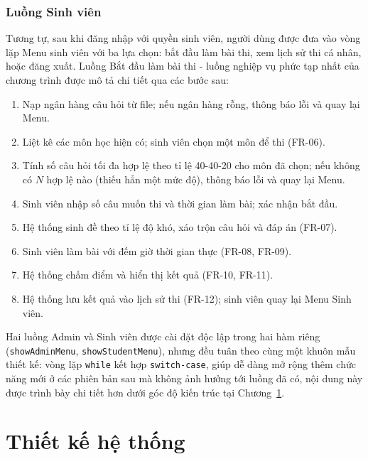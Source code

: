 \documentclass[11pt]{report}
\begin{document}
\subsection*{Luồng Sinh viên}

Tương tự, sau khi đăng nhập với quyền sinh viên, người dùng được đưa vào vòng lặp Menu sinh viên với ba lựa chọn: bắt đầu làm bài thi, xem lịch sử thi cá nhân, hoặc đăng xuất. Luồng Bắt đầu làm bài thi - luồng nghiệp vụ phức tạp nhất của chương trình được mô tả chi tiết qua các bước sau:

\begin{enumerate}[leftmargin=*, label=\arabic*.]
    \item Nạp ngân hàng câu hỏi từ file; nếu ngân hàng rỗng, thông báo lỗi và quay lại Menu.
    \item Liệt kê các môn học hiện có; sinh viên chọn một môn để thi (FR-06).
    \item Tính số câu hỏi tối đa hợp lệ theo tỉ lệ 40-40-20 cho môn đã chọn; nếu không có $N$ hợp lệ nào (thiếu hẳn một mức độ), thông báo lỗi và quay lại Menu.
    \item Sinh viên nhập số câu muốn thi và thời gian làm bài; xác nhận bắt đầu.
    \item Hệ thống sinh đề theo tỉ lệ độ khó, xáo trộn câu hỏi và đáp án (FR-07).
    \item Sinh viên làm bài với đếm giờ thời gian thực (FR-08, FR-09).
    \item Hệ thống chấm điểm và hiển thị kết quả (FR-10, FR-11).
    \item Hệ thống lưu kết quả vào lịch sử thi (FR-12); sinh viên quay lại Menu Sinh viên.
\end{enumerate}

Hai luồng Admin và Sinh viên được cài đặt độc lập trong hai hàm riêng (\texttt{showAdminMenu}, \texttt{showStudentMenu}), nhưng đều tuân theo cùng một khuôn mẫu thiết kế: vòng lặp \texttt{while} kết hợp \texttt{switch-case}, giúp dễ dàng mở rộng thêm chức năng mới ở các phiên bản sau mà không ảnh hưởng tới luồng đã có, nội dung này được trình bày chi tiết hơn dưới góc độ kiến trúc tại Chương~\ref{chap:thietke}.

\chapter{Thiết kế hệ thống}
\label{chap:thietke}
\end{document}
